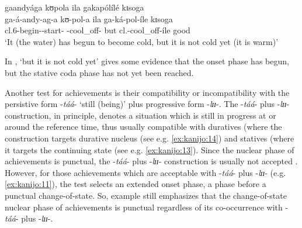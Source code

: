 \documentclass[output=paper,newtxmath,modfonts,nonflat,draftmode]{langsci/langscibook}
\begin{document}
\ea \label{ex:kanijo:9}
\glll gaandyága kʊpola ila gakapólílé kɪsoga\\
ga-á-andy-ag-a kʊ-pol-a ila ga-ká-pol-íle kɪsoga\\   
cl.\textsc{6}-begin--start- -cool\_off- but cl.-cool\_off-íle good\\
\glt ‘It (the water) has begun to become cold, but it is not cold yet (it is warm)’\\
\z

In , ‘but it is not cold yet’ gives some evidence that the onset phase has begun, but the stative coda phase has not yet been reached.

Another test for achievements is their compatibility or incompatibility with the persistive form -\textit{táá}- ‘still (being)’ plus progressive form -\textit{lɪɪ}-. The -\textit{táá}- plus -\textit{lɪɪ}- construction, in principle, denotes a situation which is still in progress at or around the reference time, thus usually compatible with duratives (where the construction targets durative nucleus (see e.g. \ref{ex:kanijo:14}) and statives (where it targets the continuing state (see e.g. \ref{ex:kanijo:13}). Since the nuclear phase of achievements is punctual, the -\textit{táá}- plus -\textit{lɪɪ}- construction is usually not accepted . However, for those achievements which are acceptable with -\textit{táá}- plus -\textit{lɪɪ}- (e.g. \ref{ex:kanijo:11}), the test selects an extended onset phase, a phase before a punctual change-of-state. So, example  still emphasizes that the change-of-state nuclear phase of achievements is punctual regardless of its co-occurrence with -\textit{táá}- plus -\textit{lɪɪ}-. 

\label{ex:kanijo:10}
\z

\z
\end{document}
